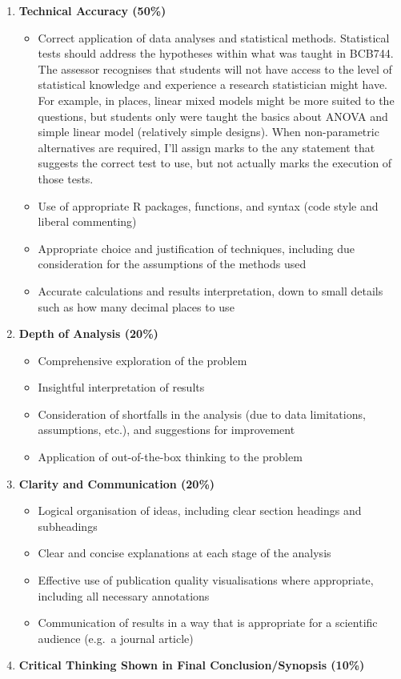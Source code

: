 \documentclass[
  british,
  10pt,
]{article}
\providecommand{\tightlist}{%
  \setlength{\itemsep}{0pt}\setlength{\parskip}{0pt}}
\begin{document}
\begin{enumerate}
\def\labelenumi{\arabic{enumi}.}
\tightlist
\item
  \textbf{Technical Accuracy (50\%)}

  \begin{itemize}
  \tightlist
  \item
    Correct application of data analyses and statistical methods.
    Statistical tests should address the hypotheses within what was
    taught in BCB744. The assessor recognises that students will not
    have access to the level of statistical knowledge and experience a
    research statistician might have. For example, in places, linear
    mixed models might be more suited to the questions, but students
    only were taught the basics about ANOVA and simple linear model
    (relatively simple designs). When non-parametric alternatives are
    required, I'll assign marks to the any statement that suggests the
    correct test to use, but not actually marks the execution of those
    tests.
  \item
    Use of appropriate R packages, functions, and syntax (code style and
    liberal commenting)
  \item
    Appropriate choice and justification of techniques, including due
    consideration for the assumptions of the methods used
  \item
    Accurate calculations and results interpretation, down to small
    details such as how many decimal places to use
  \end{itemize}
\item
  \textbf{Depth of Analysis (20\%)}

  \begin{itemize}
  \tightlist
  \item
    Comprehensive exploration of the problem
  \item
    Insightful interpretation of results
  \item
    Consideration of shortfalls in the analysis (due to data
    limitations, assumptions, etc.), and suggestions for improvement
  \item
    Application of out-of-the-box thinking to the problem
  \end{itemize}
\item
  \textbf{Clarity and Communication (20\%)}

  \begin{itemize}
  \tightlist
  \item
    Logical organisation of ideas, including clear section headings and
    subheadings
  \item
    Clear and concise explanations at each stage of the analysis
  \item
    Effective use of publication quality visualisations where
    appropriate, including all necessary annotations
  \item
    Communication of results in a way that is appropriate for a
    scientific audience (e.g.~a journal article)
  \end{itemize}
\item
  \textbf{Critical Thinking Shown in Final Conclusion/Synopsis (10\%)}


\end{enumerate}
\end{document}

